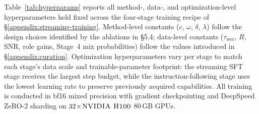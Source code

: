 \documentclass{article}
\begin{document}
Table~\ref{tab:hyperparams} reports all method-, data-, and
optimization-level hyperparameters held fixed across the four-stage
training recipe of \S\ref{appendix:streaming-training}. Method-level
constants ($c$, $\omega$, $\delta$, $\lambda$) follow the design choices
identified by the ablations in \S5.4; data-level constants
($\tau_{\text{wer}}$, $R$, SNR, role gains, Stage~4 mix probabilities)
follow the values introduced in \S\ref{appendix:curation}. Optimization
hyperparameters vary per stage to match each stage's data scale and
trainable-parameter footprint: the streaming SFT stage receives the
largest step budget, while the instruction-following stage uses the
lowest learning rate to preserve previously acquired capabilities. All
training is conducted in bf16 mixed precision with gradient checkpointing
and DeepSpeed ZeRO-2 sharding on $32\!\times\!\textsc{NVIDIA H100}$
$80$\,GB GPUs.
\end{document}
